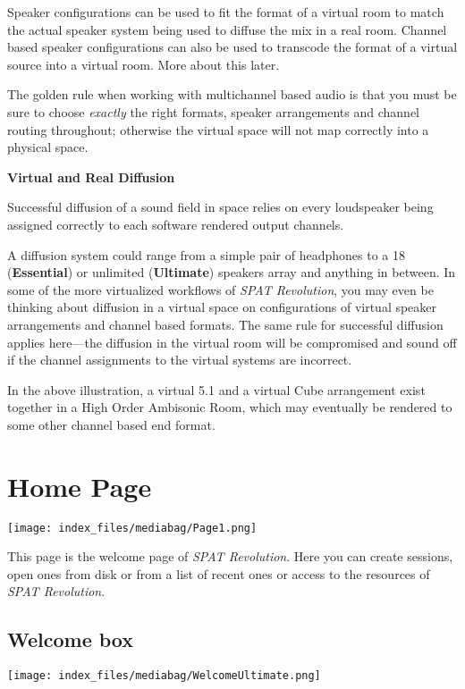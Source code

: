 \documentclass[
  letterpaper,
  DIV=11,
  numbers=noendperiod]{scrreport}
\begin{document}
Speaker configurations can be used to fit the format of a virtual room
to match the actual speaker system being used to diffuse the mix in a
real room. Channel based speaker configurations can also be used to
transcode the format of a virtual source into a virtual room. More about
this later.

The golden rule when working with multichannel based audio is that you
must be sure to choose \emph{exactly} the right formats, speaker
arrangements and channel routing throughout; otherwise the virtual space
will not map correctly into a physical space.

\textbf{Virtual and Real Diffusion}

Successful diffusion of a sound field in space relies on every
loudspeaker being assigned correctly to each software rendered output
channels.

A diffusion system could range from a simple pair of headphones to a 18
(\textbf{Essential}) or unlimited (\textbf{Ultimate}) speakers array and
anything in between. In some of the more virtualized workflows of
\emph{SPAT Revolution}, you may even be thinking about diffusion in a
virtual space on configurations of virtual speaker arrangements and
channel based formats. The same rule for successful diffusion applies
here---the diffusion in the virtual room will be compromised and sound
off if the channel assignments to the virtual systems are incorrect.

In the above illustration, a virtual 5.1 and a virtual Cube arrangement
exist together in a High Order Ambisonic Room, which may eventually be
rendered to some other channel based end format.

\hypertarget{home-page}{%
\chapter{Home Page}\label{home-page}}

\texttt{[image: index\_files/mediabag/Page1.png]}

This page is the welcome page of \emph{SPAT Revolution}. Here you can
create sessions, open ones from disk or from a list of recent ones or
access to the resources of \emph{SPAT Revolution}.

\hypertarget{welcome-box}{%
\section{Welcome box}\label{welcome-box}}

\texttt{[image: index\_files/mediabag/WelcomeUltimate.png]}
\end{document}
